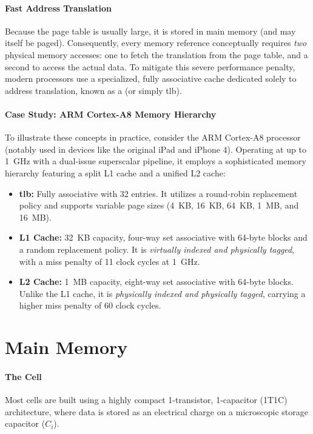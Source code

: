 \paragraph{Fast Address Translation} 
Because the page table is usually large, it is stored in main memory (and may itself be paged). Consequently, every memory reference conceptually requires \textit{two} physical memory accesses: one to fetch the translation from the page table, and a second to access the actual data. To mitigate this severe performance penalty, modern processors use a specialized, fully associative cache dedicated solely to address translation, known as a \textbf{} (or simply \gls{tlb}).

\paragraph{Case Study: ARM Cortex-A8 Memory Hierarchy}
To illustrate these concepts in practice, consider the ARM Cortex-A8 processor (notably used in devices like the original iPad and iPhone 4). Operating at up to 1~GHz with a dual-issue superscalar pipeline, it employs a sophisticated memory hierarchy featuring a split L1 cache and a unified L2 cache:
\begin{itemize}
    \item \textbf{\gls{tlb}:} Fully associative with 32 entries. It utilizes a round-robin replacement policy and supports variable page sizes (4~KB, 16~KB, 64~KB, 1~MB, and 16~MB).
    \item \textbf{L1 Cache:} 32~KB capacity, four-way set associative with 64-byte blocks and a random replacement policy. It is \textit{virtually indexed and physically tagged}, with a miss penalty of 11 clock cycles at 1~GHz.
    \item \textbf{L2 Cache:} 1~MB capacity, eight-way set associative with 64-byte blocks. Unlike the L1 cache, it is \textit{physically indexed and physically tagged}, carrying a higher miss penalty of 60 clock cycles.
\end{itemize}

\section{Main Memory}

\paragraph{The  Cell}
Most  cells are built using a highly compact 1-transistor, 1-capacitor (1T1C) architecture, where data is stored as an electrical charge on a microscopic storage capacitor (\(C_i\)). 


